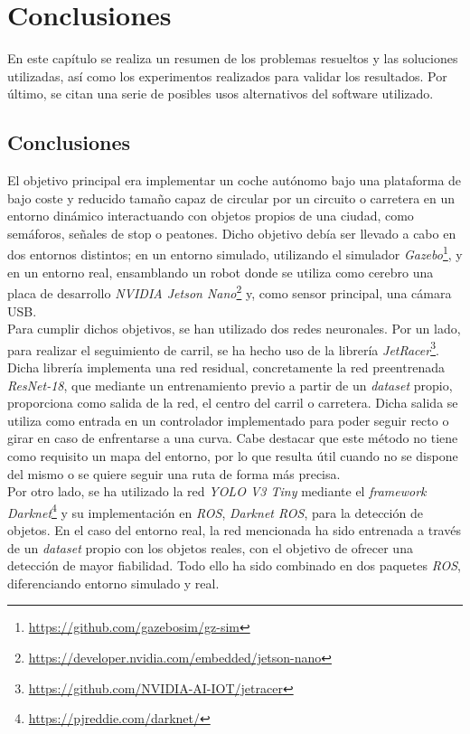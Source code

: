 \chapter{Conclusiones}
\label{cap:capitulo5}
En este capítulo se realiza un resumen de los problemas resueltos y las soluciones utilizadas, así como los experimentos realizados para validar los resultados. Por último, se citan una serie de posibles usos alternativos del software utilizado.

\section{Conclusiones}
\label{section:conclusiones}
El objetivo principal era implementar un coche autónomo bajo una plataforma de bajo coste y reducido tamaño capaz de circular por un circuito o carretera en un entorno dinámico interactuando con objetos propios de una ciudad, como semáforos, señales de stop o peatones. Dicho objetivo debía ser llevado a cabo en dos entornos distintos; en un entorno simulado, utilizando el simulador \textit{Gazebo}\footnote{\url{https://github.com/gazebosim/gz-sim}}, y en un entorno real, ensamblando un robot donde se utiliza como cerebro una placa de desarrollo \textit{NVIDIA Jetson Nano}\footnote{\url{https://developer.nvidia.com/embedded/jetson-nano}} y, como sensor principal, una cámara USB.\\

Para cumplir dichos objetivos, se han utilizado dos redes neuronales. Por un lado, para realizar el seguimiento de carril, se ha hecho uso de la librería \textit{JetRacer}\footnote{\url{https://github.com/NVIDIA-AI-IOT/jetracer}}. Dicha librería implementa una red residual, concretamente la red preentrenada \textit{ResNet-18}, que mediante un entrenamiento previo a partir de un \textit{dataset} propio, proporciona como salida de la red, el centro del carril o carretera. Dicha salida se utiliza como entrada en un controlador implementado para poder seguir recto o girar en caso de enfrentarse a una curva. Cabe destacar que este método no tiene como requisito un mapa del entorno, por lo que resulta útil cuando no se dispone del mismo o se quiere seguir una ruta de forma más precisa.\\

Por otro lado, se ha utilizado la red \textit{YOLO V3 Tiny} mediante el \textit{framework} \textit{Darknet}\footnote{\url{https://pjreddie.com/darknet/}} y su implementación en \textit{ROS}, \textit{Darknet ROS}, para la detección de objetos. En el caso del entorno real, la red mencionada ha sido entrenada a través de un \textit{dataset} propio con los objetos reales, con el objetivo de ofrecer una detección de mayor fiabilidad. 
Todo ello ha sido combinado en dos paquetes \textit{ROS}, diferenciando entorno simulado y real.\\

